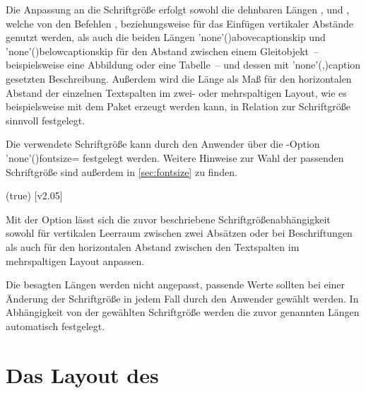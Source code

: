 \begin{DeclareEntity*}{}
\begin{DeclareEntity*}{}
\begin{DeclareEntity*}{}
Die Anpassung an die Schriftgröße erfolgt sowohl die dehnbaren Längen 
,  und , 
welche von den Befehlen ,  beziehungsweise 
 für das Einfügen vertikaler Abstände genutzt werden, als auch 
die beiden Längen \Length'none'(){abovecaptionskip} und 
\Length'none'(){belowcaptionskip} für den Abstand zwischen 
einem Gleitobjekt~-- beispielsweise eine Abbildung oder eine Tabelle~-- und 
dessen mit \Macro'none'(,){caption} 
gesetzten Beschreibung. Außerdem wird die Länge  als Maß für 
den horizontalen Abstand der einzelnen Textspalten im zwei- oder mehrspaltigen 
Layout, wie es beispielsweise mit dem Paket  erzeugt werden 
kann, in Relation zur Schriftgröße sinnvoll festgelegt.

Die verwendete Schriftgröße kann durch den Anwender über die \KOMAScript-Option 
\Option'none'(){fontsize=} festgelegt 
werden.
Weitere Hinweise zur Wahl der passenden Schriftgröße sind außerdem in 
\autoref{sec:fontsize} zu finden.

\begin{Declaration}
  {}
  (true)
  [v2.05]
\printdeclarationlist

Mit der Option  lässt sich die zuvor beschriebene 
Schriftgrößenabhängigkeit sowohl für vertikalen Leerraum zwischen zwei Absätzen 
oder bei Beschriftungen als auch für den horizontalen Abstand zwischen den 
Textspalten im mehrspaltigen Layout anpassen.
\begin{DeclareValues}{}
  Die besagten Längen werden nicht angepasst, passende Werte sollten bei einer 
  Änderung der Schriftgröße in jedem Fall durch den Anwender gewählt werden.
  In Abhängigkeit von der gewählten Schriftgröße werden die zuvor genannten 
  Längen automatisch festgelegt.
\end{DeclareValues}
\end{Declaration}



\section{%
  Das Layout des \CDs%
}

\end{DeclareEntity*}
\end{DeclareEntity*}
\end{DeclareEntity*}
